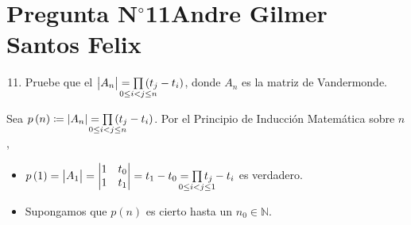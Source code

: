 \section{Pregunta N$^{\circ}$11\qquad Andre Gilmer Santos Felix}



\begin{frame}
	\begin{enumerate}\setcounter{enumi}{10}
		\item

		      Pruebe que el
		      \begin{math}
			      \begin{vmatrix}
				      A_{n}
			      \end{vmatrix}=
			      \prod\limits_{\mathclap{0\leq i< j\leq n}}
			      \left(t_{j}-t_{i}\right)
		      \end{math},
		      donde $A_{n}$ es la matriz de Vandermonde.
	\end{enumerate}

	\begin{solution}

		Sea
		\begin{math}
			p\left(n\right)\coloneqq
			\left|A_{n}\right|=
			\prod\limits_{\mathclap{0\leq i< j\leq n}}
			\left(t_{j}-t_{i}\right)
		\end{math}.
		Por el \alert{Principio de Inducción Matemática} sobre $n$,

		\begin{itemize}
			\item

			      \begin{math}
				      p\left(1\right)=
				      \begin{vmatrix}
					      A_{1}
				      \end{vmatrix}=
				      \begin{vmatrix}
					      1 & t_{0} \\
					      1 & t_{1}
				      \end{vmatrix}=
				      t_{1}-t_{0}=
				      \prod\limits_{\mathclap{0\leq i< j\leq 1}}
				      t_{j}-t_{i}
			      \end{math}
			      es verdadero.

			\item

			      Supongamos que $p\left(n\right)$ es cierto hasta un
			      $n_{0}\in\mathbb{N}$.


\end{itemize}
\end{solution}
\end{frame}

